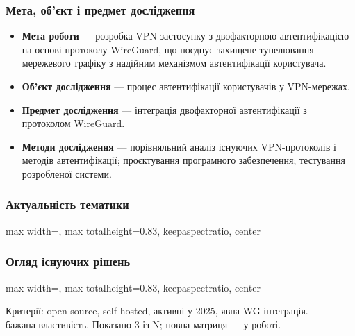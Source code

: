\documentclass[aspectratio=43,14pt]{beamer}
\newcommand{\fitfig}[1]{%
  \begin{adjustbox}{max width=\textwidth, max totalheight=0.83\textheight,
                    keepaspectratio, center}%
  \end{adjustbox}%
}
\begin{document}
\begin{frame}
  \frametitle{Мета, об'єкт і предмет дослідження}
  \small
  \begin{itemize}
    \setlength{\itemsep}{0.55em}
    \item \textbf{Мета роботи} --- розробка VPN-застосунку з двофакторною
      автентифікацією на основі протоколу WireGuard, що поєднує захищене
      тунелювання мережевого трафіку з надійним механізмом автентифікації
      користувача.
    \item \textbf{Об'єкт дослідження} --- процес автентифікації користувачів
      у VPN-мережах.
    \item \textbf{Предмет дослідження} --- інтеграція двофакторної
      автентифікації з протоколом WireGuard.
    \item \textbf{Методи дослідження} --- порівняльний аналіз існуючих
      VPN-протоколів і методів автентифікації; проєктування програмного
      забезпечення; тестування розробленої системи.
  \end{itemize}
\end{frame}


\begin{frame}[c]
  \frametitle{Актуальність тематики}
  \fitfig{fig-problem}
\end{frame}


\begin{frame}[c]
  \frametitle{Огляд існуючих рішень}
  \fitfig{fig-matrix4}
  \par\vspace{0.25em}
  {\footnotesize\color{clGrey}\centering
    Критерії: open-source, self-hosted, активні у 2025, явна WG-інтеграція.\
    \cmark{} --- бажана властивість.
    Показано 3 із N; повна матриця --- у роботі.\par}
\end{frame}
\end{document}
